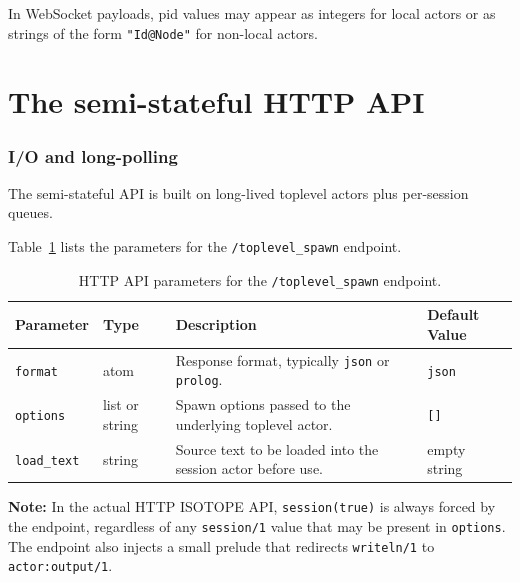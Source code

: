\noindent In WebSocket payloads, pid values may appear as integers for local
actors or as strings of the form \texttt{"Id@Node"} for non-local actors.\\

\section{The semi-stateful HTTP API}\label{sec:semi-stateful-http-api}

\subsubsection{I/O and long-polling}

\noindent The semi-stateful API is built on long-lived toplevel actors plus
per-session queues.

\medskip
\noindent Table~\ref{table:api-parameters-toplevel-spawn} lists the
parameters for the \texttt{/toplevel\_spawn} endpoint.

\begin{table}[h!]
\centering
\begin{tabular}{| m{1.8cm} | m{1.6cm} | m{5.4cm} | m{2.5cm} |}
\hline
\textbf{Parameter} & \textbf{Type} & \textbf{Description} & \textbf{Default Value} \\
\hline
\texttt{format} & atom & Response format, typically \texttt{json} or \texttt{prolog}. & \texttt{json} \\
\hline
\texttt{options} & list or string & Spawn options passed to the underlying toplevel actor. & \texttt{[]} \\
\hline
\texttt{load\_text} & string & Source text to be loaded into the session actor before use. & empty string \\
\hline
\end{tabular}
\caption{HTTP API parameters for the \texttt{/toplevel\_spawn} endpoint.}
\label{table:api-parameters-toplevel-spawn}
\end{table}

\noindent \textbf{Note:} In the actual HTTP ISOTOPE API, \texttt{session(true)}
is always forced by the endpoint, regardless of any \texttt{session/1} value
that may be present in \texttt{options}. The endpoint also injects a small
prelude that redirects \texttt{writeln/1} to \texttt{actor:output/1}.\\

